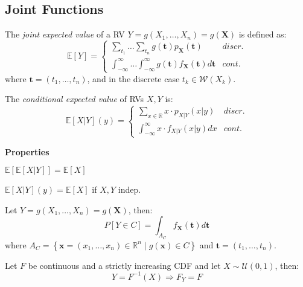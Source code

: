 \documentclass[8pt,a4paper]{extarticle}     %
\newcommand{\R}{\mathbb{R}}
\newcommand{\colnull}{\vfill\null\columnbreak}
\renewcommand{\vec}[1]{\mathbf{#1}}
\begin{document}
\begin{multicols}{4}
\subsection{Joint Functions}
\begin{boxdefinition} 
	The \textit{joint expected value} of a RV $Y=g(X_1,\dots,X_n)=g(\vec{X})$ is defined as:
	\[
		\mathbb{E}\left[Y\right]=
		\begin{cases}
			\displaystyle \sum_{t_1}\dots\sum_{t_n} g(\vec{t})p_{\vec{X}}(\vec{t})  &\textit{discr.}\\[2em]
			\displaystyle \int_{-\infty}^{\infty}\dots\int_{-\infty}^{\infty} g(\vec{t})f_{\vec{X}}(\vec{t})d\vec{t} &\textit{cont.}
		\end{cases}
	\]
	where $\vec{t}=(t_1,\dots,t_n)$, and in the discrete case $t_k\in\mathcal{W}(X_k)$. 
\end{boxdefinition}
\begin{boxdefinition} 
	The \textit{conditional expected value} of RVs $X,Y$ is:
	\[
		\mathbb{E}\left[X|Y\right](y)= 
		\begin{cases}
			\displaystyle  \sum_{x\in\R} x\cdot p_{X|Y}(x|y)&\textit{discr.}\\[2em]
			\displaystyle \int_{-\infty}^{\infty} x\cdot f_{X|Y}(x|y)dx &\textit{cont.}
		\end{cases}
	\]
\end{boxdefinition}
\begin{listb}
	\item [] \textbf{Properties}
	\item $\mathbb{E}\left[\mathbb{E}\left[X|Y\right]\right] = \mathbb{E}\left[X\right]$
	\item $\mathbb{E}\left[X|Y\right](y)=\mathbb{E}\left[X\right]$ if $X,Y$ indep. 
\end{listb}

\begin{boxdefinition}
	Let $Y=g(X_1,\dots,X_n)=g(\vec{X})$, then:
	\[
		P\left[Y\in C\right]=\int_{A_C} f_\vec{X}(\vec{t})d\vec{t} 
	\]
	where $A_C=\left\{ \vec{x}=(x_1,\dots,x_n)\in\R^n \mid g(\vec{x})\in C\right\}$ and $\vec{t}=(t_1,\dots,t_n)$. 
\end{boxdefinition} 

\begin{boxtheorem}[Transformation] 
	Let $F$ be continuous and a strictly increasing CDF and let $X\sim\mathcal{U}(0,1)$, then:
	\[
		Y=F^{-1}(X) \Rightarrow F_Y = F 
	\]
\end{boxtheorem}
\colnull


\end{multicols}
\end{document}
